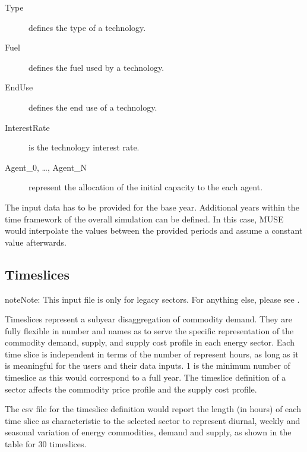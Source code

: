 \documentclass[letterpaper,10pt,english]{sphinxmanual}
\begin{document}
\begin{description}
\item[{Type}] \leavevmode
defines the type of a technology.

\item[{Fuel}] \leavevmode
defines the fuel used by a technology.

\item[{EndUse}] \leavevmode
defines the end use of a technology.

\item[{InterestRate}] \leavevmode
is the technology interest rate.

\item[{Agent\_0, …, Agent\_N}] \leavevmode
represent the allocation of the initial capacity to the each agent.

\end{description}

The input data has to be provided for the base year. Additional years within the time
framework of the overall simulation can be defined. In this case, MUSE would interpolate
the values between the provided periods and assume a constant value afterwards.


\subsection{Time\sphinxhyphen{}slices}
\label{\detokenize{inputs/timeslices:time-slices}}\label{\detokenize{inputs/timeslices:inputs-legacy-timeslices}}\label{\detokenize{inputs/timeslices::doc}}
\begin{sphinxadmonition}{note}{Note:}
This input file is only for legacy sectors. For anything else, please see .
\end{sphinxadmonition}

Time\sphinxhyphen{}slices represent a sub\sphinxhyphen{}year disaggregation of commodity demand. They are fully
flexible in number and names as to serve the specific representation of the commodity
demand, supply, and supply cost profile in each energy sector.  Each time slice is
independent in terms of the number of represent hours, as long as it is meaningful for the
users and their data inputs. 1 is the minimum number of time\sphinxhyphen{}slice as this would
correspond to a full year.  The time\sphinxhyphen{}slice definition of a sector affects the commodity
price profile and the supply cost profile.

The csv file for the time\sphinxhyphen{}slice definition would report the length (in hours) of each
time slice as characteristic to the selected sector to represent diurnal, weekly and
seasonal variation of energy commodities, demand and supply, as shown in the table for
30 time\sphinxhyphen{}slices.
\end{document}
